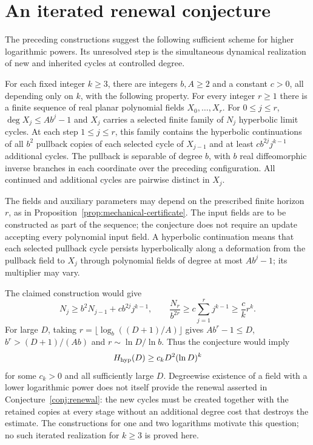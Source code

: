 \section{An iterated renewal conjecture}\label{sec:conjecture}

The preceding constructions suggest the following sufficient scheme for
higher logarithmic powers. Its unresolved step is the simultaneous
dynamical realization of new and inherited cycles at controlled degree.

\begin{conjecture}\label{conj:renewal}
For each fixed integer $k\ge3$, there are integers $b,A\ge2$ and a
constant $c>0$, all depending only on $k$, with the following property.
For every integer $r\ge1$ there is a finite sequence of real planar
polynomial fields $X_0,\ldots,X_r$. For $0\le j\le r$,
$\deg X_j\le Ab^j-1$ and $X_j$ carries a selected finite family of $N_j$
hyperbolic limit cycles. At each step $1\le j\le r$, this family contains
the hyperbolic continuations of all $b^2$ pullback copies of each selected
cycle of $X_{j-1}$ and at least $c b^{2j}j^{k-1}$ additional cycles.
The pullback is separable of degree $b$, with $b$ real diffeomorphic
inverse branches in each coordinate over the preceding configuration.
All continued and additional cycles are pairwise distinct in $X_j$.
\end{conjecture}

The fields and auxiliary parameters may depend on the prescribed finite
horizon $r$, as in Proposition~\ref{prop:mechanical-certificate}. The input fields
are to be constructed as part of the sequence; the conjecture does not
require an update accepting every polynomial input field. A hyperbolic
continuation means that each selected pullback cycle persists hyperbolically
along a deformation from the pullback field to $X_j$ through polynomial
fields of degree at most $Ab^j-1$; its multiplier may vary.

The claimed construction would give
\[
 N_j\ge b^2N_{j-1}+c b^{2j}j^{k-1},\qquad
 \frac{N_r}{b^{2r}}\ge c\sum_{j=1}^rj^{k-1}\ge\frac{c}{k}r^k.
\]
For large $D$, taking $r=\lfloor\log_b((D+1)/A)\rfloor$ gives $Ab^r-1\le D$,
$b^r>(D+1)/(Ab)$ and $r\sim\ln D/\ln b$. Thus the conjecture would imply
\[
 H_{\mathrm{hyp}}(D)\ge c_k D^2(\ln D)^k
\]
for some $c_k>0$ and all sufficiently large $D$. Degreewise existence of
a field with a lower logarithmic power does not itself provide the
renewal asserted in Conjecture~\ref{conj:renewal}: the new cycles must be
created together with the retained copies at every stage without an
additional degree cost that destroys the estimate. The constructions
for one and two logarithms motivate this question; no such iterated
realization for $k\ge3$ is proved here.

